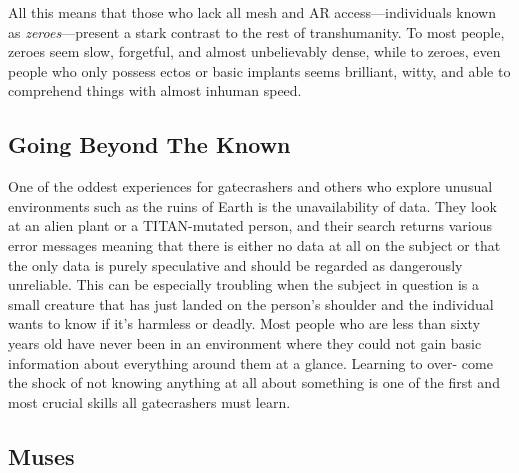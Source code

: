 All this means that those who lack all mesh and AR 
access—individuals known as \textit{zeroes}—present a stark 
contrast to the rest of transhumanity. To most people, 
zeroes seem slow, forgetful, and almost unbelievably 
dense, while to zeroes, even people who only possess 
ectos or basic implants seems brilliant, witty, and able 
to comprehend things with almost inhuman speed.

\subsection{Going Beyond The Known}

One of the oddest experiences for gatecrashers and 
others who explore unusual environments such as the 
ruins of Earth is the unavailability of data. They look 
at an alien plant or a TITAN-mutated person, and 
their search returns various error messages meaning 
that there is either no data at all on the subject or 
that the only data is purely speculative and should 
be regarded as dangerously unreliable. This can be 
especially troubling when the subject in question is 
a small creature that has just landed on the person's 
shoulder and the individual wants to know if it's 
harmless or deadly. Most people who are less than 
sixty years old have never been in an environment 
where they could not gain basic information about 
everything around them at a glance. Learning to over-
come the shock of not knowing anything at all about 
something is one of the first and most crucial skills all 
gatecrashers must learn.

\subsection{Muses}

